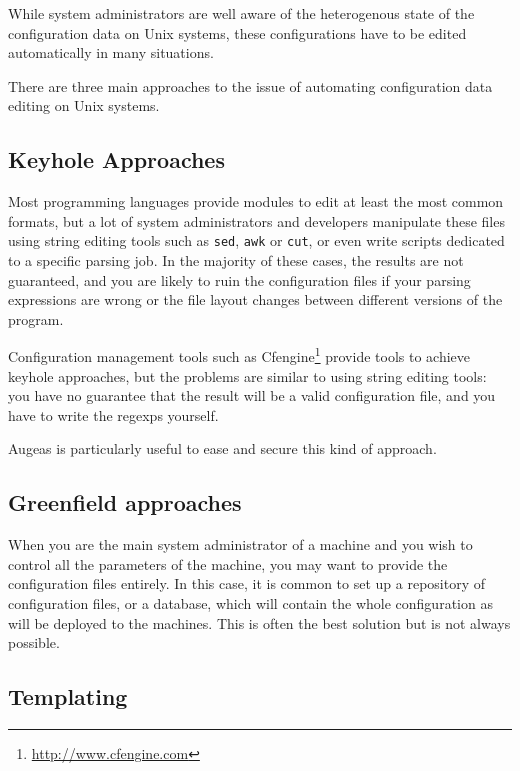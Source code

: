 While system administrators are well aware of the heterogenous state of the configuration data on Unix systems, these configurations have to be edited automatically in many situations.

There are three main approaches to the issue of automating configuration data editing on Unix systems.

\subsection{Keyhole Approaches}

Most programming languages provide modules to edit at least the most common formats, but a lot of system administrators and developers manipulate these files using string editing tools such as \texttt{sed}, \texttt{awk} or \texttt{cut}, or even write scripts dedicated to a specific parsing job. In the majority of these cases, the results are not guaranteed, and you are likely to ruin the configuration files if your parsing expressions are wrong or the file layout changes between different versions of the program.

Configuration management tools such as Cfengine\footnote{\url{http://www.cfengine.com}} provide tools to achieve keyhole approaches, but the problems are similar to using string editing tools: you have no guarantee that the result will be a valid configuration file, and you have to write the regexps yourself.


Augeas is particularly useful to ease and secure this kind of approach.

\subsection{Greenfield approaches}

When you are the main system administrator of a machine and you wish to control all the parameters of the machine, you may want to provide the configuration files entirely. In this case, it is common to set up a repository of configuration files, or a database, which will contain the whole configuration as will be deployed to the machines. This is often the best solution but is not always possible.


\subsection{Templating}

